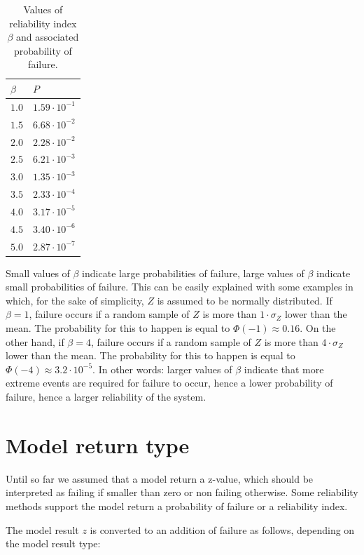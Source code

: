 \begin{longtable}{|p{1.0in}|p{1.0in}|}
\caption{Values of reliability index $\beta$ and associated probability of failure.} \label{tab:2.1} \\ \hline
$\beta $ & $P$ \\ \hline 
$1.0$ & $1.59\cdot 10^{-1}$ \\ \hline 
$1.5$ & $6.68\cdot 10^{-2}$ \\ \hline 
$2.0$ & $2.28\cdot 10^{-2}$ \\ \hline 
$2.5$ & $6.21\cdot 10^{-3}$ \\ \hline 
$3.0$ & $1.35\cdot 10^{-3}$ \\ \hline 
$3.5$ & $2.33\cdot 10^{-4}$ \\ \hline 
$4.0$ & $3.17\cdot 10^{-5}$ \\ \hline 
$4.5$ & $3.40\cdot 10^{-6}$ \\ \hline 
$5.0$ & $2.87\cdot 10^{-7}$ \\ \hline 
\end{longtable}

Small values of $\beta$ indicate large probabilities of failure, large values of $\beta$ indicate small probabilities of failure. This can be easily explained with some examples in which, for the sake of simplicity, $Z$ is assumed to be normally distributed. If $\beta=1$, failure occurs if a random sample of $Z$ is more than $1\cdot\sigma_Z$ lower than the mean. The probability for this to happen is equal to $\Phi(-1)\approx0.16$. On the other hand, if $\beta=4$, failure occurs if a random sample of $Z$ is more than $4 \cdot \sigma_Z$ lower than the mean. The probability for this to happen is equal to $\Phi(-4)\approx3.2 \cdot 10^{-5}$. In other words: larger values of $\beta$ indicate that more extreme events are required for failure to occur, hence a lower probability of failure, hence a larger reliability of the system.

\section{Model return type}
\label{sec:ModelReturnType}

Until so far we assumed that a model return a z-value, which should be interpreted as failing if smaller than zero or non failing otherwise. Some reliability methods support the model return a probability of failure or a reliability index.

The model result $z$ is converted to an addition of failure as follows, depending on the model result type:

